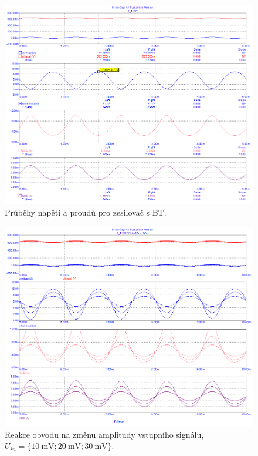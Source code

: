 \documentclass{protokol}
\begin{document}
	\begin{figure}[h!]
		\centering
		\includegraphics[width=\textwidth]{microcap/BJT/Prubehy_1.png}
		\centering
		\caption{Průběhy napětí a proudů pro zesilovač s BT.}
		\label{fig:-mc_}
	\end{figure}
	
	\begin{figure}[h!]
		\centering
		\includegraphics[width=\textwidth]{microcap/BJT/Prubehy_2_10mV-30mV.png}
		\centering
		\caption{Reakce obvodu na změnu amplitudy vstupního signálu, $ U_{in}= \{\SI{10}{\milli\volt};\SI{20}{\milli\volt};\SI{30}{\milli\volt}\} $.}
		\label{fig:-mc_}
	\end{figure}
	
\end{document}

